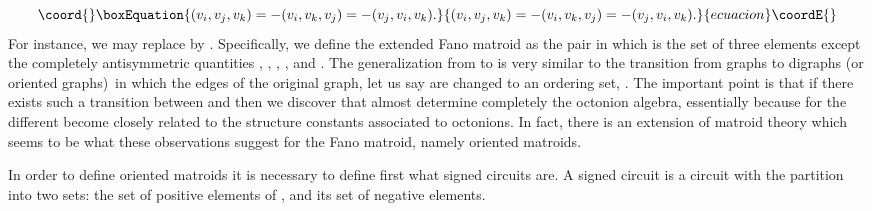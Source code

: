 \documentclass[a4paper,12pt]{article}
\begin{document}
\begin{equation}\coord{}\boxEquation{
(v_{i},v_{j},v_{k})=-(v_{i},v_{k},v_{j})=-(v_{j},v_{i},v_{k}).  \label{5}
}{
(v_{i},v_{j},v_{k})=-(v_{i},v_{k},v_{j})=-(v_{j},v_{i},v_{k}).  }{ecuacion}\coordE{}\end{equation}
For instance, we may replace \coordHE{} by \coordHE{}. Specifically, we define the extended Fano matroid 
\coordHE{} as the pair \coordHE{} in which \coordHE{} is the set of three elements \coordHE{} except the completely
antisymmetric quantities \coordHE{}, \coordHE{}, \coordHE{}, \coordHE{}, \coordHE{}  \coordHE{} and \coordHE{}. The
generalization from \coordHE{} to \coordHE{} is very similar to the
transition from graphs to digraphs (or oriented graphs)\ in which the edges
of the original graph, let us say \coordHE{} are changed to an ordering set, 
\coordHE{}. The important point is that if there exists such a
transition between \coordHE{} and \coordHE{} then we discover that \coordHE{} almost determine completely the octonion algebra, essentially because \coordHE{} for the different \coordHE{} become closely related to the
structure constants \coordHE{} associated to octonions. In fact, there is
an extension of matroid theory which seems to be what these observations
suggest for the Fano matroid, namely oriented matroids.\coordHE{}

In order to define oriented matroids it is necessary to define first what
signed circuits are. A signed circuit \coordHE{} is a circuit with the partition \coordHE{} into two sets: \coordHE{} the set of positive elements of \coordHE{},
and \coordHE{} its set of negative elements.
\end{document}
